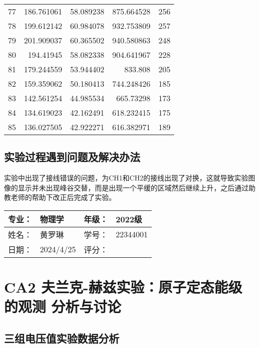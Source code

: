 \documentclass[dvipsnames, svgnames,a4paper,11pt]{article}
\begin{document}
\begin{longtable}{|r|r|r|r|r|}
	77 & 186.761061   & 58.089238   & 875.664528  & 256 \\
	78 & 199.612142   & 60.984078   & 932.753809   & 257 \\
	79 & 201.909037   & 60.365502   & 940.580863   & 248 \\
	80 & 194.41945   & 58.082338   & 904.641967   & 228 \\
	81 & 179.244559   & 53.944402   & 833.808   & 205 \\
	82 & 159.359062   & 50.180413   & 744.248426   & 185 \\
	83 & 142.561254   & 44.985534   & 665.73298   & 173 \\
	84 & 134.619023   & 42.162491   & 618.232415   & 175 \\
	85 & 136.027505   & 42.922271   & 616.382971   & 189 \\
	\bottomrule
	\end{longtable}
	
	
	
	\subsection{实验过程遇到问题及解决办法}
	
		 实验中出现了接线错误的问题，为CH1和CH2的接线出现了对换，这就导致实验图像的显示并未出现峰谷交替，而是出现一个平缓的区域然后继续上升，之后通过助教老师的帮助下改正后完成了实验。

	
	
	
	\clearpage
	
	\begin{table}
		\renewcommand\arraystretch{1.7}
		\begin{tabularx}{\textwidth}{|X|X|X|X|}
			\hline
			专业：& 物理学 &年级：& 2022级\\
			\hline
			姓名： & 黄罗琳 & 学号：&22344001 \\
			\hline
			日期：&  2024/4/25& 评分： &\\
			\hline
		\end{tabularx}
	\end{table}
	
	\section{CA2 夫兰克-赫兹实验：原子定态能级的观测 \quad\heiti 分析与讨论}
	
	\subsection{三组电压值实验数据分析}
\end{document}
